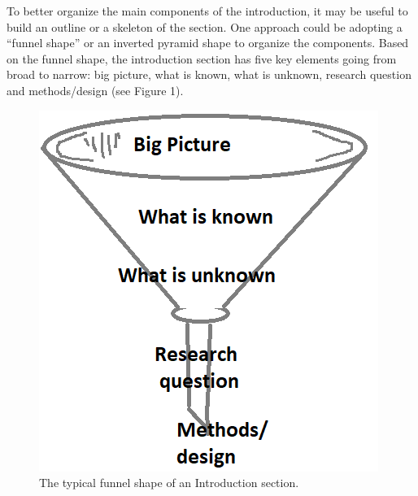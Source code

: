 \documentclass[
]{book}
\begin{document}
To better organize the main components of the introduction, it may be useful to build an outline or a skeleton of the section. One approach could be adopting a ``funnel shape'' or an inverted pyramid shape to organize the components. Based on the funnel shape, the introduction section has five key elements going from broad to narrow: big picture, what is known, what is unknown, research question and methods/design (see Figure 1).

\begin{figure}

{\centering \includegraphics[width=0.25\linewidth]{images/funnel} 

}

\caption{The typical funnel shape of an Introduction section.}\label{fig:funnel}
\end{figure}
\end{document}
